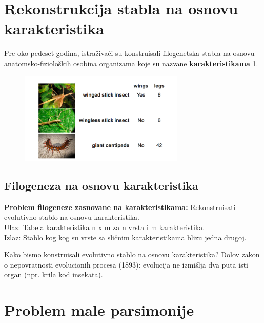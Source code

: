 \section{Rekonstrukcija stabla na osnovu karakteristika}
\label{sec:rsnok}

Pre oko pedeset godina, istra\v{z}iva\v{c}i su konstruisali filogenetska stabla na osnovu anatomsko-fiziolo\v{s}kih osobina organizama koje su nazvane \textbf{karakteristikama} \ref{fig:karakt}.

\begin{figure}[h!]
\begin{center}
\includegraphics[width=0.7\textwidth]{poglavlja/7/slike/slika10.png}
\end{center}
\label{fig:karakt}
\end{figure}

\subsection{Filogeneza na osnovu karakteristika}
\label{subsec:fnok}

\begin{tcolorbox}
\textbf{Problem filogeneze zasnovane na karakteristikama:} Rekonstruisati evolutivno stablo na osnovu karakteristika. \\
Ulaz: Tabela karakteristika n x m za n vrsta i m karakteristika. \\
Izlaz: Stablo kog kog su vrste sa sli\v{c}nim karakteristikama blizu jedna drugoj. \\
\end{tcolorbox}

Kako bismo konstruisali evolutivno stablo na osnovu karakteristika?
Dolov zakon o nepovratnosti evolucionih procesa (1893): evolucija ne izmi\v{s}lja dva puta isti organ (npr. krila kod insekata).

\section{Problem male parsimonije}
\label{sec:pmp}

